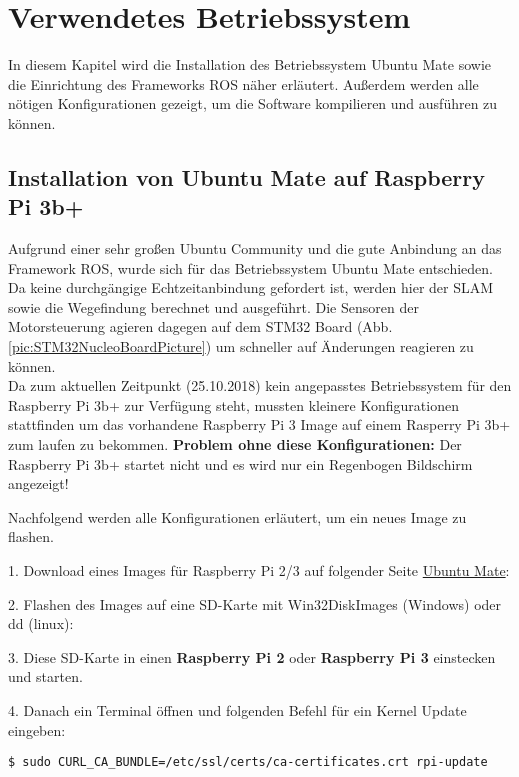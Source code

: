 \chapter{Verwendetes Betriebssystem}
In diesem Kapitel wird die Installation des Betriebssystem Ubuntu Mate sowie die Einrichtung des Frameworks ROS näher erläutert. Außerdem werden alle nötigen Konfigurationen gezeigt, um die Software kompilieren und ausführen zu können. 


\section{Installation von Ubuntu Mate auf Raspberry Pi 3b+}
Aufgrund einer sehr großen Ubuntu Community und die gute Anbindung an das Framework ROS, wurde sich für das Betriebssystem Ubuntu Mate entschieden. Da keine durchgängige Echtzeitanbindung gefordert ist, werden hier der SLAM sowie die Wegefindung berechnet und ausgeführt. Die Sensoren der Motorsteuerung agieren dagegen auf dem STM32 Board (Abb. \ref{pic:STM32NucleoBoardPicture}) um schneller auf Änderungen reagieren zu können.\\ 
Da zum aktuellen Zeitpunkt (25.10.2018) kein angepasstes Betriebssystem für den Raspberry Pi 3b+ zur Verfügung steht, mussten kleinere Konfigurationen stattfinden um das vorhandene Raspberry Pi 3 Image auf einem Rasperry Pi 3b+ zum laufen zu bekommen. 
\textbf{Problem ohne diese Konfigurationen:} Der Raspberry Pi 3b+ startet nicht und es wird nur ein Regenbogen Bildschirm angezeigt!

Nachfolgend werden alle Konfigurationen erläutert, um ein neues Image zu flashen. 

1. Download eines Images für Raspberry  Pi 2/3 auf folgender Seite \href{https://ubuntu-mate.org/download/}{Ubuntu Mate}:

2. Flashen des Images auf eine SD-Karte mit Win32DiskImages (Windows) oder dd (linux):

3. Diese SD-Karte in einen \textbf{Raspberry Pi 2} oder \textbf{Raspberry Pi 3} einstecken und starten. 

4. Danach ein Terminal öffnen und folgenden Befehl für ein Kernel Update eingeben:\\

\begin{lstlisting}
$ sudo CURL_CA_BUNDLE=/etc/ssl/certs/ca-certificates.crt rpi-update
\end{lstlisting}
\vspace{-0.8cm}

